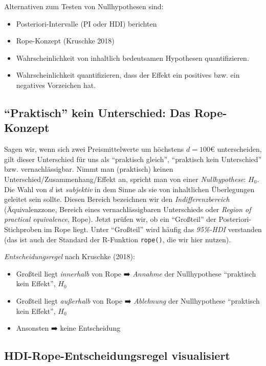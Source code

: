 \documentclass[
  a4paper,
  DIV=11]{scrreprt}
\providecommand{\tightlist}{%
  \setlength{\itemsep}{0pt}\setlength{\parskip}{0pt}}\usepackage{longtable,booktabs,array}
\theoremstyle{definition}
\theoremstyle{remark}
\begin{document}
Alternativen zum Testen von Nullhypothesen sind:

\begin{itemize}
\tightlist
\item
  Posteriori-Intervalle (PI oder HDI) berichten
\item
  Rope-Konzept (Kruschke 2018)
\item
  Wahrscheinlichkeit von inhaltlich bedeutsamen Hypothesen
  quantifizieren.
\item
  Wahrscheinlichkeit quantifizieren, dass der Effekt ein positives bzw.
  ein negatives Vorzeichen hat.
\end{itemize}

\hypertarget{praktisch-kein-unterschied-das-rope-konzept}{%
\subsection{``Praktisch'' kein Unterschied: Das
Rope-Konzept}\label{praktisch-kein-unterschied-das-rope-konzept}}

Sagen wir, wenn sich zwei Preismittelwerte um höchstens \(d=100\)€
unterscheiden, gilt dieser Unterschied für uns als ``praktisch gleich'',
``praktisch kein Unterschied'' bzw. vernachlässigbar. Nimmt man
(praktisch) keinen Unterschied/Zusammenhang/Effekt an, spricht man von
einer \emph{Nullhypothese}: \(H_0\). Die Wahl von \(d\) ist
\emph{subjektiv} in dem Sinne als sie von inhaltlichen Überlegungen
geleitet sein sollte. Diesen Bereich bezeichnen wir den
\emph{Indifferenzbereich} (Äquivalenzzone, Bereich eines
vernachlässigbaren Unterschieds oder \emph{Region of practical
equivalence}, Rope). Jetzt prüfen wir, ob ein ``Großteil'' der
Posteriori-Stichproben im Rope liegt. Unter ``Großteil'' wird häufig das
\emph{95\%-HDI} verstanden (das ist auch der Standard der R-Funktion
\texttt{rope()}, die wir hier nutzen).

\emph{Entscheidungsregel} nach Kruschke (2018):

\begin{itemize}
\tightlist
\item
  Großteil liegt \emph{innerhalb} von Rope ➡️ \emph{Annahme} der
  Nullhypothese ``praktisch kein Effekt'', \(H_0\)
\item
  Großteil liegt \emph{außerhalb} von Rope ➡️ \emph{Ablehnung} der
  Nullhypothese ``praktisch kein Effekt'', \(H_0\)
\item
  Ansonsten ➡️ keine Entscheidung
\end{itemize}

\hypertarget{hdi-rope-entscheidungsregel-visualisiert}{%
\subsection{HDI-Rope-Entscheidungsregel
visualisiert}\label{hdi-rope-entscheidungsregel-visualisiert}}
\end{document}
